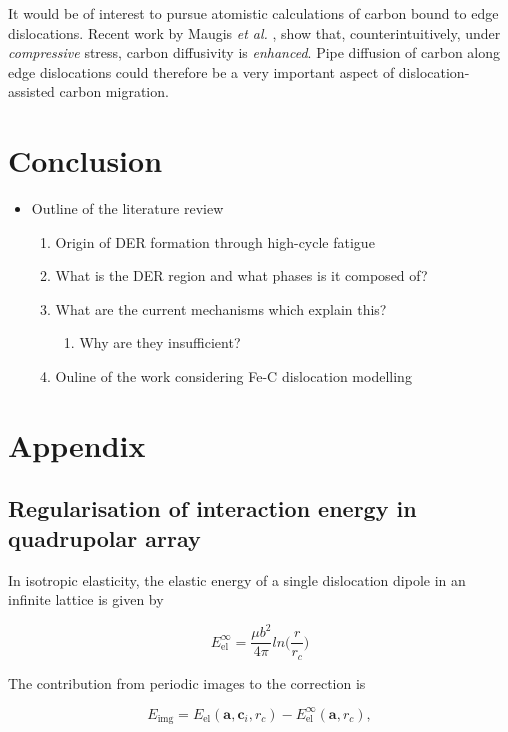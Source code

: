 \documentclass[a4paper,11pt]{article}
\begin{document}
It would be of interest to pursue atomistic calculations of carbon bound to edge
dislocations. Recent work by Maugis \emph{et al.} \cite{Maugis2020}, show that, counterintuitively, under
\emph{compressive} stress, carbon diffusivity is \emph{enhanced}. Pipe diffusion of carbon along edge
dislocations could therefore be a very important aspect of dislocation-assisted carbon migration. 


\section{Conclusion}
\label{sec:org082ea3b}


\begin{itemize}
\item Outline of the literature review 
\begin{enumerate}
\item Origin of DER formation through high-cycle fatigue
\item What is the DER region and what phases is it composed of?
\item What are the current mechanisms which explain this?
\begin{enumerate}
\item Why are they insufficient?
\end{enumerate}
\item Ouline of the work considering Fe-C dislocation modelling
\end{enumerate}
\end{itemize}

\section{Appendix}
\label{sec:orgcae7bfd}

\subsection{Regularisation of interaction energy in quadrupolar array}
\label{sec:org7c1640e}
\label{sec:Ainteractionenergy}


In isotropic elasticity, the elastic energy of a single dislocation dipole in an
infinite lattice is given by


\[ E_{\text{el}}^{\infty} = \frac{\mu b^2}{4\pi} ln \big( \frac{r}{r_{c}} \big)  \]

The contribution from periodic images to the correction is 

\[ E_{\text{img} } = E_{\text{el}} (\mathbf{a}, \mathbf{c}_i , r_c) - E_{\text{el}}^{\infty}
   (\mathbf{a}, r_c),\]
\end{document}
